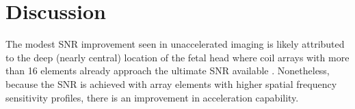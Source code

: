 \chapter{Discussion}

The modest SNR improvement seen in unaccelerated imaging is likely attributed to the deep (nearly central) location of
the fetal head where coil arrays with more than 16 elements already approach the ultimate SNR available
\cite{Wiesinger2004}.  Nonetheless, because the SNR is achieved with array elements with higher spatial frequency
sensitivity profiles, there is an improvement in acceleration capability.



